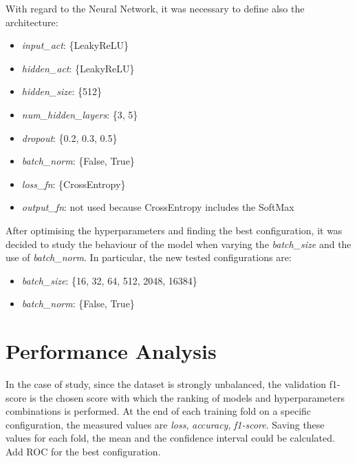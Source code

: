 \documentclass[../main]{subfiles}
\begin{document}
With regard to the Neural Network, it was necessary to define also the architecture:
\begin{itemize}
    \item \textit{input\_act}: \{LeakyReLU\}
    \item \textit{hidden\_act}: \{LeakyReLU\}
    \item \textit{hidden\_size}: \{512\}
    \item \textit{num\_hidden\_layers}: \{3, 5\}
    \item \textit{dropout}: \{0.2, 0.3, 0.5\}
    \item \textit{batch\_norm}: \{False, True\}
    \item \textit{loss\_fn}: \{CrossEntropy\}
    \item \textit{output\_fn}: not used because CrossEntropy includes the SoftMax
\end{itemize}

After optimising the hyperparameters and finding the best configuration, it was decided to study the behaviour of the model when varying the \textit{batch\_size} and the use of \textit{batch\_norm}.
In particular, the new tested configurations are:
\begin{itemize}
    \item \textit{batch\_size}: \{16, 32, 64, 512, 2048, 16384\}
    \item \textit{batch\_norm}: \{False, True\}
\end{itemize}

\section{Performance Analysis}
In the case of study, since the dataset is strongly unbalanced, the validation f1-score is the chosen score with which the ranking of models and hyperparameters combinations is performed.
At the end of each training fold on a specific configuration, the measured values are \textit{loss}, \textit{accuracy}, \textit{f1-score}.
Saving these values for each fold, the mean and the confidence interval could be calculated.
Add ROC for the best configuration.
\end{document}
